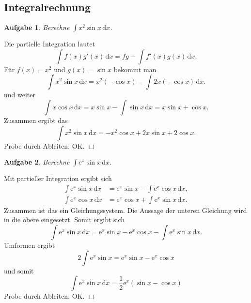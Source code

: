 \documentclass[a4paper,10pt,fleqn,twoside]{scrartcl}
\numberwithin{equation}{section}
\newcommand{\ee}{\mathrm e}
\newcommand{\strong}[1]{{\normalfont\sffamily\bfseries #1}}
\theoremstyle{Aufgabe}
\newtheorem{Aufgabe}{\sffamily Aufgabe}[section]
\begin{document}
\newpage

\subsection{Integralrechnung}
\begin{Aufgabe}
Berechne $\displaystyle\int x^2\sin x\,\mathrm dx$.
\end{Aufgabe}
\noindent\strong{Lösung.}
Die partielle Integration lautet
\begin{equation}
\int f(x)g'(x)\,\mathrm dx = fg-\int f'(x)g(x)\,\mathrm dx.
\end{equation}
Für $f(x)=x^2$ und $g(x)=\sin x$ bekommt man
\begin{equation}
\int x^2\sin x\,\mathrm dx = x^2(-\cos x) - \int 2x(-\cos x)\,\mathrm dx.
\end{equation}
und weiter
\begin{equation}
\int x\cos x\,\mathrm dx = x\sin x - \int \sin x\,\mathrm dx = x\sin x + \cos x.
\end{equation}
Zusammen ergibt das
\begin{equation}
\int x^2\sin x\,\mathrm dx = -x^2\cos x +2x\sin x+2\cos x.
\end{equation}
Probe durch Ableiten: OK. $\Box$

\begin{Aufgabe}
Berechne $\displaystyle\int\ee^x\sin x\,\mathrm dx$.
\end{Aufgabe}

\noindent\strong{Lösung.}
Mit partieller Integration ergibt sich
\begin{align}
\int \ee^x\sin x\,\mathrm dx &= \ee^x\sin x - \int \ee^x\cos x\,\mathrm dx,\\
\int \ee^x\cos x\,\mathrm dx &= \ee^x\cos x + \int \ee^x\sin x\,\mathrm dx.
\end{align}
Zusammen ist das ein Gleichungssystem. Die Aussage der unteren
Gleichung wird in die obere eingesetzt. Somit ergibt sich
\begin{equation}
\int \ee^x\sin x\,\mathrm dx = \ee^x\sin x - \ee^x\cos x - \int \ee^x\sin x\,\mathrm dx.
\end{equation}
Umformen ergibt
\begin{equation}
2\int \ee^x\sin x = \ee^x\sin x-\ee^x\cos x
\end{equation}
und somit
\begin{equation}
\int \ee^x\sin x\,\mathrm dx = \frac{1}{2}\ee^x(\sin x-\cos x)
\end{equation}
Probe durch Ableiten: OK. $\Box$
\end{document}
